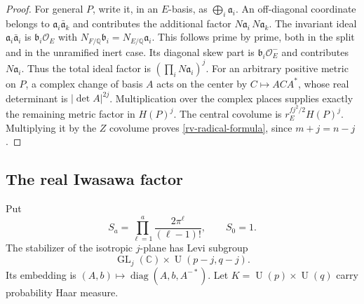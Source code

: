 \begin{proof}
For general $P$, write it, in an $E$-basis, as
$\bigoplus_i\mathfrak a_i$.  An off-diagonal coordinate
belongs to $\mathfrak a_i\bar{\mathfrak a}_k$ and
contributes the additional factor
$N\mathfrak a_i\,N\mathfrak a_k$.
The invariant ideal $\mathfrak a_i\bar{\mathfrak a}_i$
is $\mathfrak b_i\mathcal O_E$ with
$N_{F/\mathbb Q}\mathfrak b_i=N_{E/\mathbb Q}\mathfrak a_i$.
This follows prime by prime, both in the split and in
the unramified inert case.  Its diagonal skew part is
$\mathfrak b_i\mathcal O_E^-$ and contributes
$N\mathfrak a_i$.  Thus the total ideal factor is
$(\prod_iN\mathfrak a_i)^j$.
For an arbitrary positive metric on $P$, a complex
change of basis $A$ acts on the center by $C\mapsto ACA^*$,
whose real determinant is $|\det A|^{2j}$.
Multiplication over the complex places supplies exactly
the remaining metric factor in $H(P)^j$.
The central covolume is
$r_E^{fj^2/2}H(P)^j$.
Multiplying it by the $Z$ covolume proves
\eqref{rv-radical-formula}, since $m+j=n-j$.
\end{proof}

\subsection{The real Iwasawa factor}

Put
\[
 S_a=\prod_{\ell=1}^{a}\frac{2\pi^\ell}{(\ell-1)!},
                   \qquad S_0=1.
\]
The stabilizer of the isotropic $j$-plane has Levi
subgroup
\[
       \operatorname{GL}_j(\mathbb C)\times
                          \operatorname U(p-j,q-j).
\]
Its embedding is
$(A,b)\mapsto\operatorname{diag}(A,b,A^{-*})$.
Let $K=\operatorname U(p)\times\operatorname U(q)$
carry probability Haar measure.

